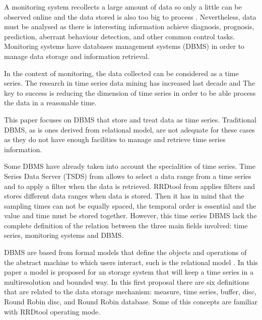 A monitoring system recollects a
large amount of data so only a little can be observed online and the
data stored is also too big to process \parencite{keogh97}. Nevertheless, data must be analysed as there is interesting information achieve  diagnosis, prognosis, prediction, aberrant behaviour detection, and other common control tasks. Monitoring systems have databases management systems (DBMS) in order to manage data storage and information retrieval. 


In the context of monitoring, the data collected can be considered as a time
series. The research in time series data mining has
increased last decade \parencite{fu11} and  The key to success is
reducing the dimension of time series in order to be able process the
data in a reasonable time.

This paper focuses on DBMS that store and treat data as time series.
Traditional DBMS, as is ones derived from relational model, are not adequate for these cases as they do not have enough facilities to manage and retrieve time series information. 

Some DBMS have already taken into account the
specialities of time series.  Time Series Data Server (TSDS) from
\textcite{weigel10} allows to select a data range from a time series and
to apply a filter when the data is retrieved.  RRDtool from
\textcite{rrdtool} applies filters and stores different data ranges when
data is stored. Then it has in mind that the sampling times can not be
equally spaced, the temporal order is essential and the value and time
must be stored together. However, this time series DBMS lack the complete definition of the relation between the three main fields involved: time series, monitoring systems and DBMS.


DBMS are based from formal models that define
the objects and operations of the abstract machine to which users
interact, such is the relational model \parencite{date}. In this paper
a model is proposed for an storage system that will keep a time series
in a multiresolution and bounded way.  In this first proposal there
are six definitions that are related to the data storage mechanism:
measure, time series, buffer, disc, Round Robin disc, and Round Robin
database. Some of this concepts are familiar with RRDtool
operating mode.





